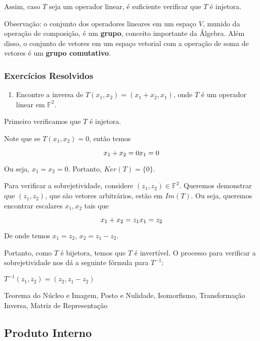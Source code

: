 \documentclass[
]{article}
\begin{document}
Assim, caso \(T\) seja um operador linear, é suficiente verificar que
\(T\) é injetora.

Observação: o conjunto dos operadores lineares em um espaço \(V\),
munido da operação de composição, é um \textbf{grupo}, conceito
importante da Álgebra. Além disso, o conjunto de vetores em um espaço
vetorial com a operação de soma de vetores é um \textbf{grupo
comutativo}.

\hypertarget{exercuxedcios-resolvidos-2}{%
\subsubsection{Exercícios Resolvidos}\label{exercuxedcios-resolvidos-2}}

\begin{enumerate}
\def\labelenumi{\arabic{enumi}.}
\item
  Encontre a inversa de \(T(x_1, x_2) = (x_1 + x_2, x_1)\), onde \(T\) é
  um operador linear em \(\mathbb{F}^2\).
\end{enumerate}

Primeiro verificamos que \(T\) é injetora.

Note que se \(T(x_1, x_2) = 0\), então temos

\[x_1 + x_2 = 0 \\
x_1 = 0\]

Ou seja, \(x_1 = x_2 = 0\). Portanto, \(Ker(T) = \{ 0 \}\).

Para verificar a sobrejetividade, considere
\((z_1, z_2) \in \mathbb{F}^2\). Queremos demonstrar que \((z_1, z_2)\),
que são vetores arbitrários, estão em \(Im(T)\). Ou seja, queremos
encontrar escalares \(x_1, x_2\) tais que

\[x_1 + x_2 = z_1 \\
x_1 = z_2\]

De onde temos \(x_1 = z_2\), \(x_2 = z_1 - z_2\).

Portanto, como \(T\) é bijetora, temos que \(T\) é invertível. O
processo para verificar a sobrejetividade nos dá a seguinte fórmula para
\(T^{-1}\):

\(T^{-1}(z_1,z_2) = (z_2, z_1-z_2)\)

Teorema do Núcleo e Imagem, Posto e Nulidade, Isomorfismo, Transformação
Inversa, Matriz de Representação

\hypertarget{produto-interno}{%
\subsection{Produto Interno}\label{produto-interno}}
\end{document}

